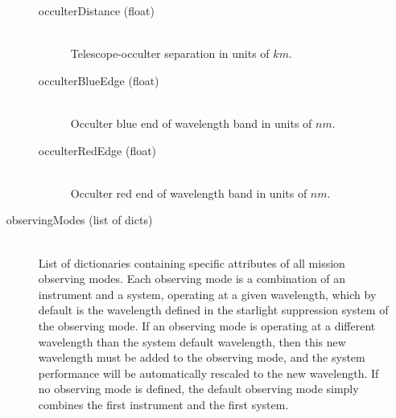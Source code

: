 \documentclass[cleanfoot]{asme2ej}
\begin{document}
\begin{itemize}
\begin{description}
\begin{description}
        \item[occulterDistance (float)] \hfill \\ Telescope-occulter separation in units of $km$.
        \item[occulterBlueEdge (float)]\hfill \\ Occulter blue end of wavelength band in units of $nm$.
        \item[occulterRedEdge (float)]\hfill \\ Occulter red end of wavelength band in units of $nm$.
    \end{description}
    \item[observingModes (list of dicts)]\hfill \\ List of dictionaries containing specific attributes of all mission observing modes. Each observing mode is a combination of an instrument and a system, operating at a given wavelength, which by default is the wavelength defined in the starlight suppression system of the observing mode. If an observing mode is operating at a different wavelength than the system default wavelength, then this new wavelength must be added to the observing mode, and the system performance will be automatically rescaled to the new wavelength. If no observing mode is defined, the default observing mode simply combines the first instrument and the first system.
    

\end{description}
\end{itemize}
\end{document}
